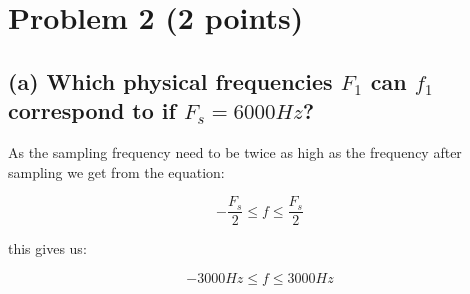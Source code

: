 \section{Problem 2 (2 points)}

\subsection*{(a) Which physical frequencies $F_1$ can $f_1$ correspond to if $F_s = 6000Hz$?}
As the sampling frequency need to be twice as high as the frequency after sampling we get from the equation:

\begin{equation*}
    -\frac{F_s}{2}\leq f \leq \frac{F_s}{2}
\end{equation*}

this gives us:

\begin{equation*}
    -3000Hz\leq f \leq 3000Hz
\end{equation*}

